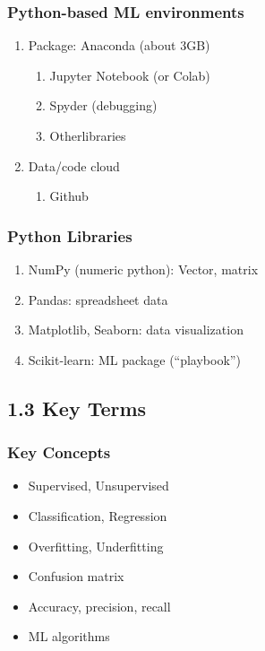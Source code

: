 \documentclass{article}
\begin{document}
\subsubsection*{Python-based ML environments}
\begin{enumerate}
    \item Package: Anaconda (about 3GB)
    \begin{enumerate}
        \item Jupyter Notebook (or Colab)
        \item Spyder (debugging)
        \item Otherlibraries
    \end{enumerate}
    \item Data/code cloud
    \begin{enumerate}
        \item Github
    \end{enumerate}
\end{enumerate}
\subsubsection*{Python Libraries}
\begin{enumerate}
    \item NumPy (numeric python): Vector, matrix
    \item Pandas: spreadsheet data
    \item Matplotlib, Seaborn: data visualization
    \item Scikit-learn: ML package (``playbook'')
\end{enumerate}

\subsection*{1.3 Key Terms}
\subsubsection*{Key Concepts}
\begin{itemize}
    \item Supervised, Unsupervised
    \item Classification, Regression
    \item Overfitting, Underfitting
    \item Confusion matrix
    \item Accuracy, precision, recall
    \item ML algorithms
\end{itemize}
\end{document}
